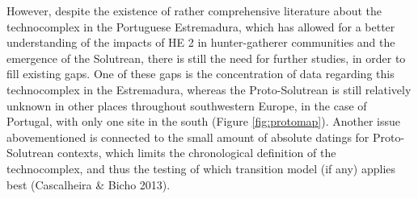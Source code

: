 \documentclass[12pt,twoside]{reedthesis}
\begin{document}
However, despite the existence of rather comprehensive literature about the technocomplex in the Portuguese Estremadura, which has allowed for a better understanding of the impacts of HE 2 in hunter-gatherer communities and the emergence of the Solutrean, there is still the need for further studies, in order to fill existing gaps. One of these gaps is the concentration of data regarding this technocomplex in the Estremadura, whereas the Proto-Solutrean is still relatively unknown in other places throughout southwestern Europe, in the case of Portugal, with only one site in the south (Figure \ref{fig:protomap}). Another issue abovementioned is connected to the small amount of absolute datings for Proto-Solutrean contexts, which limits the chronological definition of the technocomplex, and thus the testing of which transition model (if any) applies best (Cascalheira \& Bicho 2013).
\end{document}
